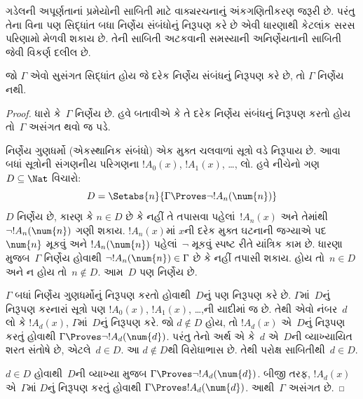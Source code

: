 \begingroup
\makeatletter{}\makeatother


\label{guunit:OLP-0279}


ગડેલની અપૂર્ણતાનાં પ્રમેયોની સાબિતી માટે
વાક્યરચનાનું અંકગણિતીકરણ જરૂરી છે. પરંતુ
તેના વિના પણ સિદ્ધાંત બધા નિર્ણેય
સંબંધોનું નિરૂપણ કરે છે એવી ધારણાથી
કેટલાંક સરસ પરિણામો મેળવી શકાય છે. તેની
સાબિતી અટકવાની સમસ્યાની અનિર્ણેયતાની
સાબિતી જેવી વિકર્ણ દલીલ છે.

\begin{thm}
જો $\Gamma$ એવો સુસંગત સિદ્ધાંત હોય જે
દરેક નિર્ણેય સંબંધનું નિરૂપણ
કરે છે, તો $\Gamma$ નિર્ણેય નથી.
\end{thm}

\begin{proof}
ધારો કે~$\Gamma$ નિર્ણેય છે. હવે
બતાવીએ કે તે દરેક નિર્ણેય સંબંધનું
નિરૂપણ કરતો હોય તો~$\Gamma$ અસંગત થવો જ
પડે.

નિર્ણેય ગુણધર્મો (એકસ્થાનિક સંબંધો)
એક મુક્ત ચલવાળાં સૂત્રો વડે નિરૂપાય
છે. આવા બધાં સૂત્રોની સંગણનીય પરિગણના
$!A_0(x)$, $!A_1(x)$, \dots, લો. હવે
નીચેનો ગણ~$D \subseteq \Nat$ વિચારો:
\[
D = \Setabs{n}{\Gamma \Proves \lnot !A_n(\num{n})}
\]
$D$ નિર્ણેય છે, કારણ કે $n \in D$
છે કે નહીં તે તપાસવા પહેલાં~$!A_n(x)$
અને તેમાંથી~$\lnot !A_n(\num{n})$ ગણી
શકાય. $!A_n(x)$માં $x$ની દરેક મુક્ત
ઘટનાની જગ્યાએ પદ~$\num{n}$ મૂકવું અને
$!A_n(\num{n})$ પહેલાં~$\lnot$ મૂકવું સ્પષ્ટ
રીતે યાંત્રિક કામ છે. ધારણા મુજબ~$\Gamma$
નિર્ણેય હોવાથી
$\lnot !A_n(\num{n}) \in \Gamma$ છે કે નહીં
તપાસી શકાય. હોય તો~$n \in D$ અને
ન હોય તો~$n \notin D$. આમ~$D$
પણ નિર્ણેય છે.

$\Gamma$ બધાં નિર્ણેય ગુણધર્મોનું
નિરૂપણ કરતો હોવાથી~$D$નું પણ
નિરૂપણ કરે છે. $\Gamma$માં~$D$નું
નિરૂપણ કરનારાં સૂત્રો પણ
$!A_0(x)$, $!A_1(x)$, \dots,ની યાદીમાં
જ છે. તેથી એવો નંબર~$d$ લો કે
$!A_d(x)$, $\Gamma$માં~$D$નું
નિરૂપણ કરે. જો $d \notin D$ હોય,
તો $!A_d(x)$ એ~$D$નું નિરૂપણ
કરતું હોવાથી $\Gamma \Proves
\lnot !A_d(\num{d})$. પરંતુ તેનો અર્થ
એ કે~$d$ એ~$D$ની વ્યાખ્યાયિત શરત
સંતોષે છે, એટલે~$d \in D$. આ
$d \notin D$થી વિરોધાભાસ છે. તેથી
પરોક્ષ સાબિતીથી~$d \in D$.

$d \in D$ હોવાથી~$D$ની વ્યાખ્યા મુજબ
$\Gamma \Proves \lnot !A_d(\num{d})$.
બીજી તરફ, $!A_d(x)$ એ~$\Gamma$માં
$D$નું નિરૂપણ કરતું હોવાથી
$\Gamma \Proves !A_d(\num{d})$.
આથી~$\Gamma$ અસંગત છે.
\end{proof}

